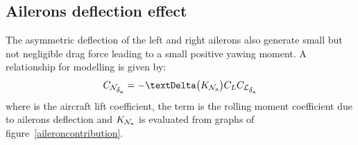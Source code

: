\subsection{Ailerons deflection effect}
\label{subsec2.3.2}

The asymmetric deflection of the left and right ailerons also generate small but not negligible drag force leading to a small positive yawing moment. A relationship for modelling \CNdeltaa is given by:
\begin{equation}
\label{eq:yawailerons}
\CNdeltaa = - \textrm \textDelta \bigl(K_{\mathcal{N}_\textrm a} \bigr) \CLift \CLdeltaa
\end{equation}
where \CLift is the aircraft lift coefficient, the term \CLdeltaa is the rolling moment coefficient due to ailerons deflection and $K_{\mathcal{N}_\textrm a}$ is evaluated from graphs of figure~\vref{aileroncontribution}.

